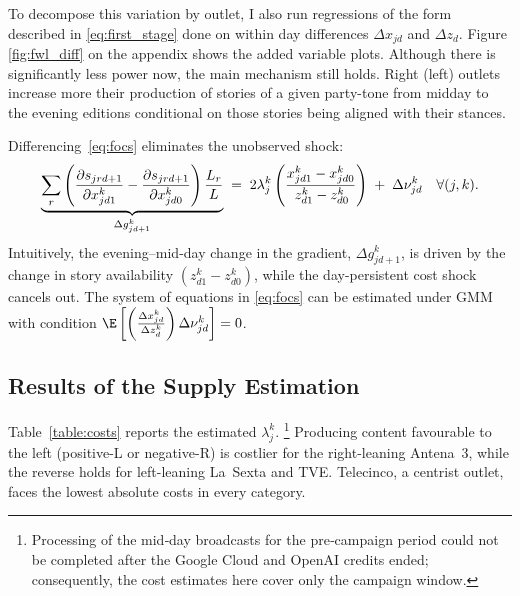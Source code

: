 \documentclass[12pt]{article}
\begin{document}
To decompose this variation by outlet, I also run regressions of the form described in  \ref{eq:first_stage} done on within day differences $ \Delta x_{jd}$ and $\Delta z_{d}$. Figure \ref{fig:fwl_diff} on the appendix shows the added variable plots. Although there is significantly less power now, the main mechanism still holds. Right (left) outlets increase more their production of stories of a given party-tone from midday to the evening editions conditional on those stories being aligned with their stances. 











Differencing~\eqref{eq:focs} eliminates the unobserved shock:
\begin{equation}\label{eq:diff_foc}
	\underbrace{%
		\sum_{r}\left(
		\frac{\partial s_{jrd+1}}{\partial x_{jd1}^k}
		-
		\frac{\partial s_{jrd+1}}{\partial x_{jd0}^k}
		\right)\frac{L_r}{L}
	}_{\Delta g_{jd+1}^k}
	\;=\;
	2\lambda_j^k
	\left(
	\frac{x_{jd1}^k-x_{jd0}^k}{\,z_{d1}^k-z_{d0}^k}
	\right)
	\;+\;
	\Delta\nu_{jd}^k \quad \forall(j,k).
\end{equation}
Intuitively, the evening–mid-day change in the gradient, $\Delta g_{jd+1}^k$, is driven by the change in story availability $(z_{d1}^k-z_{d0}^k)$, while the day-persistent cost shock cancels out. The system of equations in \ref{eq:focs} can be estimated under GMM with condition $\E \left[\left( \frac{\Delta x_{jd}^k}{\Delta z_{d}^k} \right)  \Delta\nu_{jd}^k \right]= 0 $. 



\subsection{Results of the Supply Estimation}





Table~\ref{table:costs} reports the estimated $\lambda_j^k$. \footnote{Processing of the mid‑day broadcasts for the pre‑campaign period could not be completed after the Google Cloud and OpenAI credits ended; consequently, the cost estimates here cover only the campaign window. }
Producing content favourable to the left (positive-L or negative-R)
is costlier for the right-leaning Antena~3,
while the reverse holds for left-leaning La~Sexta and TVE.  
Telecinco, a centrist outlet, faces the lowest absolute costs in every category.
\end{document}
